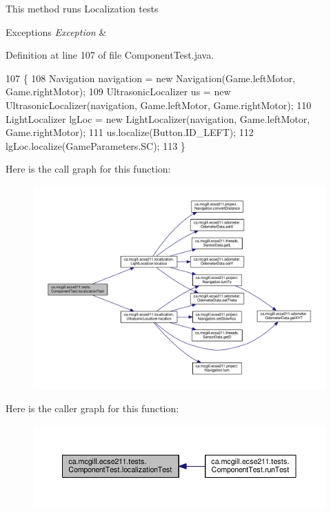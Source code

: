 This method runs Localization tests


\begin{DoxyExceptions}{Exceptions}
{\em Exception} & \\
\hline
\end{DoxyExceptions}


Definition at line 107 of file Component\+Test.\+java.


\begin{DoxyCode}
107                                                                   \{
108     Navigation navigation = \textcolor{keyword}{new} Navigation(Game.leftMotor, Game.rightMotor);
109     UltrasonicLocalizer us = \textcolor{keyword}{new} UltrasonicLocalizer(navigation, Game.leftMotor, Game.rightMotor);
110     LightLocalizer lgLoc = \textcolor{keyword}{new} LightLocalizer(navigation, Game.leftMotor, Game.rightMotor);
111     us.localize(Button.ID\_LEFT);
112     lgLoc.localize(GameParameters.SC);
113   \}
\end{DoxyCode}
Here is the call graph for this function\+:\nopagebreak
\begin{figure}[H]
\begin{center}
\leavevmode
\includegraphics[width=350pt]{enumca_1_1mcgill_1_1ecse211_1_1tests_1_1_component_test_ad11712dd74c5c64e84cd71186a59a087_cgraph}
\end{center}
\end{figure}
Here is the caller graph for this function\+:\nopagebreak
\begin{figure}[H]
\begin{center}
\leavevmode
\includegraphics[width=350pt]{enumca_1_1mcgill_1_1ecse211_1_1tests_1_1_component_test_ad11712dd74c5c64e84cd71186a59a087_icgraph}
\end{center}
\end{figure}
